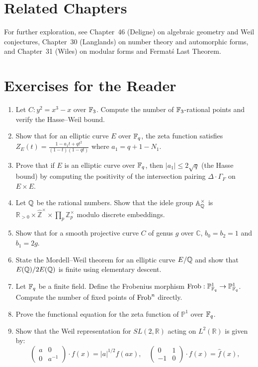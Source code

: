 \section{Related Chapters}
For further exploration, see Chapter~46 (Deligne) on algebraic geometry and Weil conjectures, Chapter~30 (Langlands) on number theory and automorphic forms, and Chapter~31 (Wiles) on modular forms and Fermat\'s Last Theorem.

\section*{Exercises for the Reader}

\begin{enumerate}
    \item [B] Let $C: y^2 = x^3 - x$ over $\mathbb{F}_3$. Compute the number of $\mathbb{F}_3$-rational points and verify the Hasse--Weil bound.
    \item [I] Show that for an elliptic curve $E$ over $\mathbb{F}_q$, the zeta function satisfies $Z_E(t) = \frac{1 - a_1 t + q t^2}{(1-t)(1-qt)}$ where $a_1 = q + 1 - N_1$.
    \item [A] Prove that if $E$ is an elliptic curve over $\mathbb{F}_q$, then $|a_1| \leq 2\sqrt{q}$ (the Hasse bound) by computing the positivity of the intersection pairing $\Delta \cdot \Gamma_F$ on $E \times E$.
    \item [I] Let $\mathbb{Q}$ be the rational numbers. Show that the idele group $\mathbb{A}_{\mathbb{Q}}^\times$ is $\mathbb{R}_{>0} \times \widehat{\mathbb{Z}}^\times \times \prod_p \mathbb{Z}_p^\times$ modulo discrete embeddings.
    \item [B] Show that for a smooth projective curve $C$ of genus $g$ over $\mathbb{C}$, $b_0 = b_2 = 1$ and $b_1 = 2g$.
    \item [I] State the Mordell--Weil theorem for an elliptic curve $E/\mathbb{Q}$ and show that $E(\mathbb{Q})/2E(\mathbb{Q})$ is finite using elementary descent.
    \item [B] Let $\mathbb{F}_q$ be a finite field. Define the Frobenius morphism $\operatorname{Frob}: \mathbb{P}^1_{\mathbb{F}_q} \to \mathbb{P}^1_{\mathbb{F}_q}$. Compute the number of fixed points of $\operatorname{Frob}^n$ directly.
    \item [I] Prove the functional equation for the zeta function of $\mathbb{P}^1$ over $\mathbb{F}_q$.
    \item [I] Show that the Weil representation for $SL(2,\mathbb{R})$ acting on $L^2(\mathbb{R})$ is given by:
    \[
    \begin{pmatrix} a & 0 \\ 0 & a^{-1} \end{pmatrix} \cdot f(x) = |a|^{1/2} f(ax), \quad \begin{pmatrix} 0 & 1 \\ -1 & 0 \end{pmatrix} \cdot f(x) = \hat{f}(x),
\]
\end{enumerate}
